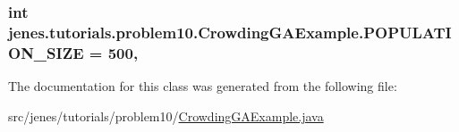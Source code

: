 \hypertarget{classjenes_1_1tutorials_1_1problem10_1_1_crowding_g_a_example_a4a9e06723f82ad9881314eac82f4765a}{
\subsubsection[{P\-O\-P\-U\-L\-A\-T\-I\-O\-N\-\_\-\-S\-I\-Z\-E}]{\setlength{\rightskip}{0pt plus 5cm}int jenes.\-tutorials.\-problem10.\-Crowding\-G\-A\-Example.\-P\-O\-P\-U\-L\-A\-T\-I\-O\-N\-\_\-\-S\-I\-Z\-E = 500\hspace{0.3cm}{\ttfamily [static]}, {\ttfamily [private]}}}\label{classjenes_1_1tutorials_1_1problem10_1_1_crowding_g_a_example_a4a9e06723f82ad9881314eac82f4765a}


The documentation for this class was generated from the following file\-:\begin{DoxyCompactItemize}
\item 
src/jenes/tutorials/problem10/\hyperlink{_crowding_g_a_example_8java}{Crowding\-G\-A\-Example.\-java}\end{DoxyCompactItemize}

